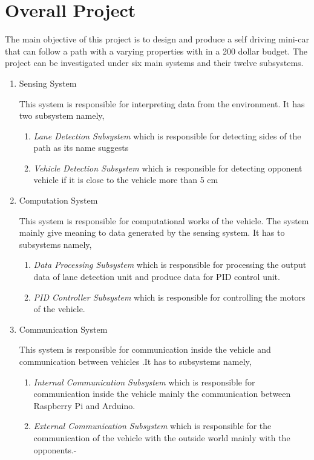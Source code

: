 \documentclass[a4paper,12pt]{article}
\begin{document}
	
		\section{Overall Project}
	
	The main objective of this project is to design and produce a self driving mini-car that can follow a path with a varying properties with in a 200 dollar budget. The project can be investigated under six main systems and their twelve subsystems.
	
	\begin{enumerate}
		\item Sensing System
			
			This system is responsible for interpreting data from the environment. It has two subsystem namely,
			
			\begin{enumerate}
				\item \textit{Lane Detection Subsystem} which is responsible for detecting sides of the path as its name suggests
				\item \textit{Vehicle Detection Subsystem} which is responsible for detecting opponent vehicle if it is close to the vehicle more than 5 cm
			\end{enumerate}
		
		\item Computation System
		
			This system is responsible for computational works of the vehicle. The system mainly give meaning to data generated by the sensing system. It has to subsystems namely,
			
			\begin{enumerate}
				\item \textit{Data Processing Subsystem} which is responsible for processing the output data of lane detection unit and produce data for PID control unit.
				\item \textit{PID Controller Subsystem} which is responsible for controlling the motors of the vehicle.
			\end{enumerate}
			
		\item Communication System	
		
		This system is responsible for communication inside the vehicle and communication between vehicles .It has to subsystems namely,
			
			\begin{enumerate}
				\item \textit{Internal Communication Subsystem} which is responsible for communication inside the vehicle mainly the communication between Raspberry Pi and Arduino.						\item \textit{External Communication Subsystem} which is responsible for the communication of the vehicle with the outside world mainly with the opponents.-
			\end{enumerate}
		

\end{enumerate}
\end{document}
